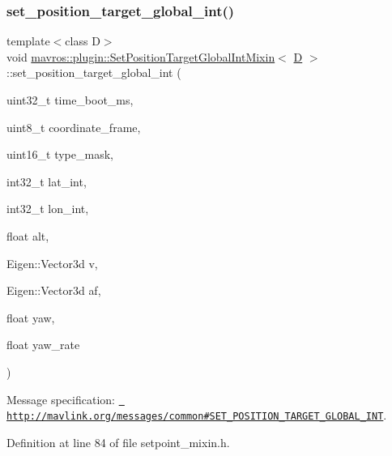 \subsubsection{\texorpdfstring{set\_position\_target\_global\_int()}{set\_position\_target\_global\_int()}}
{\footnotesize\ttfamily template$<$class D$>$ \\
void \mbox{\hyperlink{classmavros_1_1plugin_1_1SetPositionTargetGlobalIntMixin}{mavros\+::plugin\+::\+Set\+Position\+Target\+Global\+Int\+Mixin}}$<$ \mbox{\hyperlink{mavlink__sha256_8h_af316c33cc298530f245e8b55330e86b5}{D}} $>$\+::set\+\_\+position\+\_\+target\+\_\+global\+\_\+int (\begin{DoxyParamCaption}\item[{uint32\+\_\+t}]{time\+\_\+boot\+\_\+ms,  }\item[{uint8\+\_\+t}]{coordinate\+\_\+frame,  }\item[{uint16\+\_\+t}]{type\+\_\+mask,  }\item[{int32\+\_\+t}]{lat\+\_\+int,  }\item[{int32\+\_\+t}]{lon\+\_\+int,  }\item[{float}]{alt,  }\item[{Eigen\+::\+Vector3d}]{v,  }\item[{Eigen\+::\+Vector3d}]{af,  }\item[{float}]{yaw,  }\item[{float}]{yaw\+\_\+rate }\end{DoxyParamCaption})\hspace{0.3cm}{\ttfamily [inline]}}



Message specification\+: {\ttfamily \href{http://mavlink.org/messages/common\#SET_POSITION_TARGET_GLOBAL_INT}{\texttt{ http\+://mavlink.\+org/messages/common\#\+S\+E\+T\+\_\+\+P\+O\+S\+I\+T\+I\+O\+N\+\_\+\+T\+A\+R\+G\+E\+T\+\_\+\+G\+L\+O\+B\+A\+L\+\_\+\+I\+NT}}}. 



Definition at line 84 of file setpoint\+\_\+mixin.\+h.

\mbox{\label{group__plugin_ga9144d4820f4e4d8146c977ba81a59579}} 
